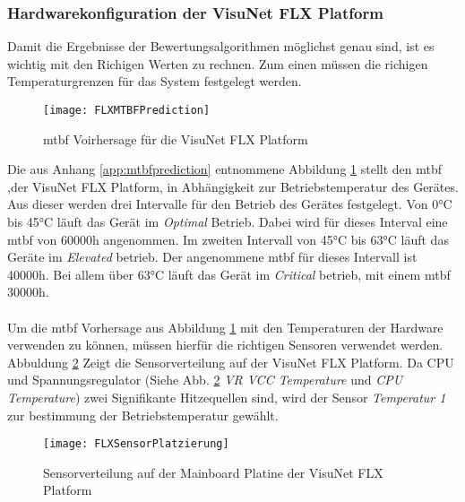 \subsubsection*{Hardwarekonfiguration der VisuNet FLX Platform}
Damit die Ergebnisse der Bewertungsalgorithmen möglichst genau sind, ist es wichtig mit den Richigen Werten zu rechnen. Zum einen müssen die richigen Temperaturgrenzen für das System festgelegt werden. 
\begin{center}
    \begin{figure}[h!]
        \centering
        \texttt{[image: FLXMTBFPrediction]}
        \caption{\ac{mtbf} Voirhersage für die VisuNet FLX Platform}
        \label{fig:FLXMTBF}
    \end{figure}
\end{center}
\vspace{-1.8cm}
Die aus Anhang \ref{app:mtbfprediction} entnommene Abbildung \ref{fig:FLXMTBF} stellt den \ac{mtbf} ,der VisuNet FLX Platform, in Abhängigkeit zur Betriebstemperatur des Gerätes. Aus dieser werden drei Intervalle für den Betrieb des 
Gerätes festgelegt. Von 0°C bis 45°C läuft das Gerät im \textit{Optimal} Betrieb. Dabei wird für dieses Interval eine \ac{mtbf} von 60000h angenommen. Im zweiten Intervall von 45°C bis 63°C läuft das Geräte im \textit{Elevated} betrieb. Der angenommene \ac{mtbf} für dieses Intervall ist 40000h. Bei allem über 63°C läuft das Gerät im \textit{Critical} betrieb, mit einem \ac{mtbf} 30000h.\\
\\
Um die \ac{mtbf} Vorhersage aus Abbildung \ref{fig:FLXMTBF} mit den Temperaturen der Hardware verwenden zu können, müssen hierfür die richtigen Sensoren verwendet werden. Abbuldung \ref{fig:FLXSensoren} Zeigt die Sensorverteilung auf der VisuNet FLX Platform. Da CPU und Spannungsregulator (Siehe Abb. \ref{fig:FLXSensoren} \textit{VR VCC Temperature} und \textit{CPU Temperature}) zwei Signifikante Hitzequellen sind, wird der Sensor \textit{Temperatur 1} zur bestimmung der Betriebstemperatur gewählt. 
\begin{center}
    \begin{figure}[h!]
        \centering
        \texttt{[image: FLXSensorPlatzierung]}
        \caption{Sensorverteilung auf der Mainboard Platine der VisuNet FLX Platform}
        \label{fig:FLXSensoren}
    \end{figure}
\end{center}
\vspace{-1.8cm}  

